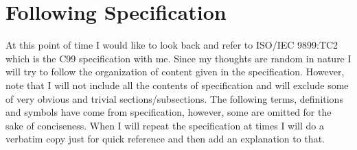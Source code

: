 


\chapter{Following Specification}
\startcolumns[n=3,distance=2em]
  \placelist
    [section]
    [alternative=c, %
     interaction=all,]
\stopcolumns


At this point of time I would like to look back and refer to ISO/IEC
9899:TC2 which is the C99 specification with me. Since my thoughts are
random in nature I will try to follow the organization of content
given in the specification. However, note that I will not include all
the contents of specification and will exclude some of very obvious
and trivial sections/subsections. The following terms, definitions and
symbols have come from specification, however, some are omitted for
the sake of conciseness. When I will repeat the specification at times I will
do a verbatim copy just for quick reference and then add an
explanation to that.

